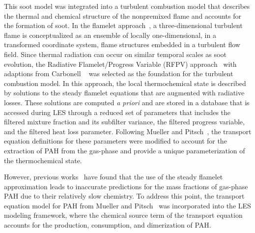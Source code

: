This soot model was integrated into a turbulent combustion model that describes the thermal and chemical structure of the nonpremixed flame and accounts for the formation of soot. In the flamelet approach~\cite{peters1984}, a three-dimensional turbulent flame is conceptualized as an ensemble of locally one-dimensional, in a transformed coordinate system, flame structures embedded in a turbulent flow field. Since thermal radiation can occur on similar temporal scales as soot evolution, the Radiative Flamelet/Progress Variable (RFPV) approach~\cite{ihme2008} with adaptions from Carbonell \etal~\cite{carbonell2009} was selected as the foundation for the turbulent combustion model. In this approach, the local thermochemical state is described by solutions to the steady flamelet equations that are augmented with radiative losses. These solutions are computed \textit{a priori} and are stored in a database that is accessed during LES through a reduced set of parameters that includes the filtered mixture fraction and its subfilter variance, the filtered progress variable, and the filtered heat loss parameter. Following Mueller and Pitsch~\cite{mueller2012}, the transport equation definitions for these parameters were modified to account for the extraction of PAH from the gas-phase and provide a unique parameterization of the thermochemical state.

However, previous works~\cite{attili2014,bisetti2012} have found that the use of the steady flamelet approximation leads to inaccurate predictions for the mass fractions of gas-phase PAH due to their relatively slow chemistry. To address this point, the transport equation model for PAH from Mueller and Pitsch~\cite{mueller2012} was incorporated into the LES modeling framework, where the chemical source term of the transport equation accounts for the production, consumption, and dimerization of PAH.

